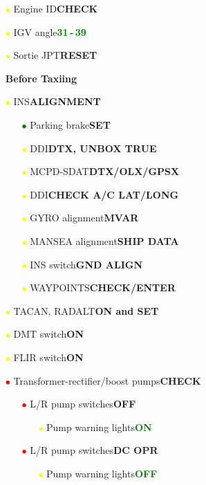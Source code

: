 \documentclass[a4paper,12pt,dvipsnames]{letter}
\newcommand{\button}[1]{\textbf{#1}}
\newcommand{\Deg}{\textdegree{}}
\newcommand{\ok}[1]{\textcolor{Green}{\textbf{#1}}}
\newcommand{\ri}{\textcolor{Red}{$\bullet$\;}}
\newcommand{\gi}{\textcolor{Green}{$\bullet$\;}}
\newcommand{\yi}{\textcolor{Yellow}{$\bullet$\;}}
\begin{document}
{\begin{itemize}
\begin{itemize}
 \item[\yi] Engine ID\dotfill\button{CHECK}
 \item[\yi] IGV angle\dotfill\ok{31\Deg\,-\,39\Deg}
 \item[\yi] Sortie JPT\dotfill\button{RESET}
\end{itemize}
\end{itemize}
\newpage
\begin{itemize}
\item[] {\LARGE\textbf{Before Taxiing}}
\item[\yi] INS\dotfill\button{ALIGNMENT}
\begin{itemize}
 \item[\gi] Parking brake\dotfill\button{SET}
 \item[\yi] DDI\dotfill\button{DTX, UNBOX TRUE}
 \item[\yi] MCPD-SDAT\dotfill\button{DTX/OLX/GPSX}
 \item[\yi] DDI\dotfill\button{CHECK A/C LAT/LONG}
 \item[\yi] GYRO alignment\dotfill\button{MVAR}
 \item[\yi] MANSEA alignment\dotfill\button{SHIP DATA}
 \item[\yi] INS switch\dotfill\button{GND ALIGN}
 \item[\yi] WAYPOINTS\dotfill\button{CHECK/ENTER}
\end{itemize}
\item[\yi] TACAN, RADALT\dotfill\button{ON and SET}
\item[\yi] DMT switch\dotfill\button{ON}
\item[\yi] FLIR switch\dotfill\button{ON}
\item[\ri] Transformer-rectifier/boost pumps\dotfill\button{CHECK}
\begin{itemize}
 \item[\ri] L/R pump switches\dotfill\button{OFF}
 \begin{itemize}
  \item[\yi] Pump warning lights\dotfill\ok{ON}
 \end{itemize}
 \item[\ri] L/R pump switches\dotfill\button{DC OPR}
 \begin{itemize}
  \item[\yi] Pump warning lights\dotfill\ok{OFF}

\end{itemize}
\end{itemize}
\end{itemize}}
\end{document}

